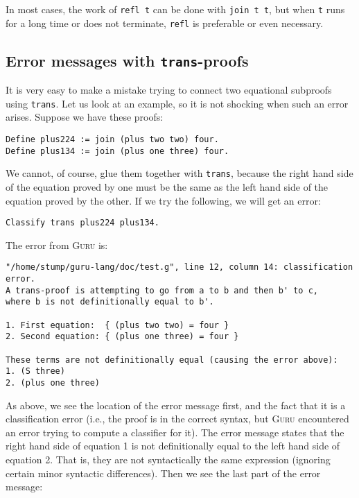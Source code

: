 \documentclass{book}[12pt]
\newcommand{\guru}[0]{\textsc{Guru}\xspace}
\begin{document}
\noindent In most cases, the work of \texttt{refl t} can be done with
\texttt{join t t}, but when \texttt{t} runs for a long time or does
not terminate, \texttt{refl} is preferable or even necessary.

\subsection{Error messages with \texttt{trans}-proofs}

It is very easy to make a mistake trying to connect two equational
subproofs using \texttt{trans}.  Let us look at an example, so it
is not shocking when such an error arises.  Suppose we have
these proofs:

\begin{verbatim}
Define plus224 := join (plus two two) four.
Define plus134 := join (plus one three) four.
\end{verbatim}

 \noindent We cannot, of course, glue them together with
\texttt{trans}, because the right hand side of the equation proved by
one must be the same as the left hand side of the equation proved by
the other.  If we try the following, we will get an error:

\begin{verbatim}
Classify trans plus224 plus134.
\end{verbatim}

\noindent The error from \guru is:

\begin{verbatim}
"/home/stump/guru-lang/doc/test.g", line 12, column 14: classification error.
A trans-proof is attempting to go from a to b and then b' to c,
where b is not definitionally equal to b'.

1. First equation:  { (plus two two) = four }
2. Second equation: { (plus one three) = four }

These terms are not definitionally equal (causing the error above):
1. (S three)
2. (plus one three)
\end{verbatim}

\noindent As above, we see the location of the error message first,
and the fact that it is a classification error (i.e., the proof is in
the correct syntax, but \guru encountered an error trying to compute a
classifier for it).  The error message states that the right hand side
of equation 1 is not definitionally equal to the left hand side of
equation 2.  That is, they are not syntactically the same expression
(ignoring certain minor syntactic differences).  Then we see the
last part of the error message:
\end{document}

